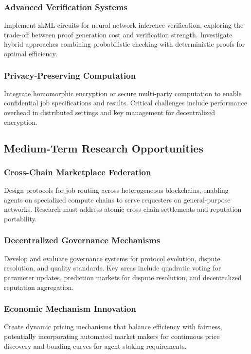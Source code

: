 \subsubsection{Advanced Verification Systems}
Implement zkML circuits for neural network inference verification, exploring the trade-off between proof generation cost and verification strength. Investigate hybrid approaches combining probabilistic checking with deterministic proofs for optimal efficiency.

\subsubsection{Privacy-Preserving Computation}
Integrate homomorphic encryption or secure multi-party computation to enable confidential job specifications and results. Critical challenges include performance overhead in distributed settings and key management for decentralized encryption.

\subsection{Medium-Term Research Opportunities}

\subsubsection{Cross-Chain Marketplace Federation}
Design protocols for job routing across heterogeneous blockchains, enabling agents on specialized compute chains to serve requesters on general-purpose networks. Research must address atomic cross-chain settlements and reputation portability.

\subsubsection{Decentralized Governance Mechanisms}
Develop and evaluate governance systems for protocol evolution, dispute resolution, and quality standards. Key areas include quadratic voting for parameter updates, prediction markets for dispute resolution, and decentralized reputation aggregation.

\subsubsection{Economic Mechanism Innovation}
Create dynamic pricing mechanisms that balance efficiency with fairness, potentially incorporating automated market makers for continuous price discovery and bonding curves for agent staking requirements.

